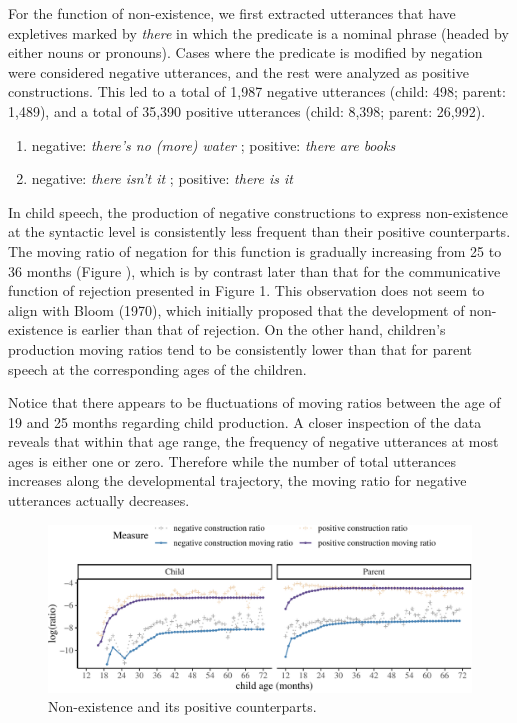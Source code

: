 \documentclass[
  english,
  man,floatsintext]{apa6}
\providecommand{\tightlist}{%
  \setlength{\itemsep}{0pt}\setlength{\parskip}{0pt}}
\begin{document}
For the function of non-existence, we first extracted utterances that have expletives marked by \emph{there} in which the predicate is a nominal phrase (headed by either nouns or pronouns). Cases where the predicate is modified by negation were considered negative utterances, and the rest were analyzed as positive constructions. This led to a total of 1,987 negative utterances (child: 498; parent: 1,489), and a total of 35,390 positive utterances (child: 8,398; parent: 26,992).

\begin{enumerate}
\def\labelenumi{(\arabic{enumi})}
\setcounter{enumi}{4}
\tightlist
\item
  negative: \emph{there's no (more) water} ; positive: \emph{there are books}
\item
  negative: \emph{there isn't it} ; positive: \emph{there is it}
\end{enumerate}

In child speech, the production of negative constructions to express non-existence at the syntactic level is consistently less frequent than their positive counterparts. The moving ratio of negation for this function is gradually increasing from 25 to 36 months (Figure ), which is by contrast later than that for the communicative function of rejection presented in Figure 1. This observation does not seem to align with Bloom (1970), which initially proposed that the development of non-existence is earlier than that of rejection. On the other hand, children's production moving ratios tend to be consistently lower than that for parent speech at the corresponding ages of the children.

Notice that there appears to be fluctuations of moving ratios between the age of 19 and 25 months regarding child production. A closer inspection of the data reveals that within that age range, the frequency of negative utterances at most ages is either one or zero. Therefore while the number of total utterances increases along the developmental trajectory, the moving ratio for negative utterances actually decreases.

\begin{figure}[H]

{\centering \includegraphics{neg_construction_article_files/figure-latex/existence-1} 

}

\caption{Non-existence and its positive counterparts.}\label{fig:existence}
\end{figure}
\end{document}
